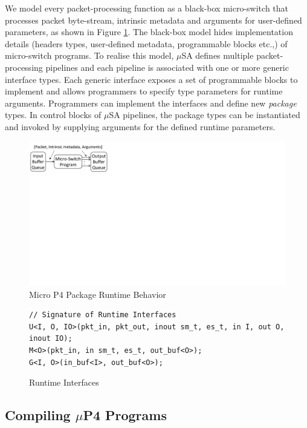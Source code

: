 We model every packet-processing function as a black-box micro-switch that processes packet byte-stream, intrinsic metadata and arguments for user-defined parameters, as shown in Figure \ref{fig:package-runtime-behavior}.
The black-box model hides implementation details (headers types, user-defined metadata, programmable blocks etc.,) of micro-switch programs.
To realise this model, $\mu$SA defines multiple packet-processing pipelines and each pipeline is associated with one or more generic interface types.
Each generic interface exposes a set of programmable blocks to implement and allows programmers to specify type parameters for runtime arguments.
Programmers can implement the interfaces and define new \emph{package} types.
In control blocks of $\mu$SA pipelines, the package types can be instantiated and invoked by supplying arguments for the defined runtime parameters. 
\begin{figure}[!h]
    \centering
    \includegraphics[trim=0 420 667 0, clip, scale=0.5]{microp4-program-model}
    \caption{Micro P4 Package Runtime Behavior}
    \label{fig:package-runtime-behavior}
\end{figure}

\begin{figure}[!h]
\begin{lstlisting}[frame=none]
// Signature of Runtime Interfaces
U<I, O, IO>(pkt_in, pkt_out, inout sm_t, es_t, in I, out O, inout IO); 
M<O>(pkt_in, in sm_t, es_t, out_buf<O>); 
G<I, O>(in_buf<I>, out_buf<O>); 
\end{lstlisting}
\caption{Runtime Interfaces}
\label{fig:interfaces}
\end{figure}


\subsection{Compiling $\mu$P4 Programs}

